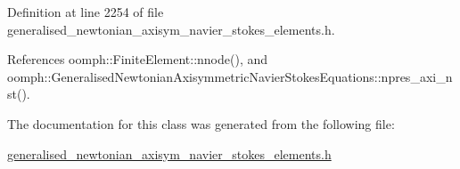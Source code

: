 Definition at line 2254 of file generalised\+\_\+newtonian\+\_\+axisym\+\_\+navier\+\_\+stokes\+\_\+elements.\+h.



References oomph\+::\+Finite\+Element\+::nnode(), and oomph\+::\+Generalised\+Newtonian\+Axisymmetric\+Navier\+Stokes\+Equations\+::npres\+\_\+axi\+\_\+nst().



The documentation for this class was generated from the following file\+:\begin{DoxyCompactItemize}
\item 
\hyperlink{generalised__newtonian__axisym__navier__stokes__elements_8h}{generalised\+\_\+newtonian\+\_\+axisym\+\_\+navier\+\_\+stokes\+\_\+elements.\+h}\end{DoxyCompactItemize}
